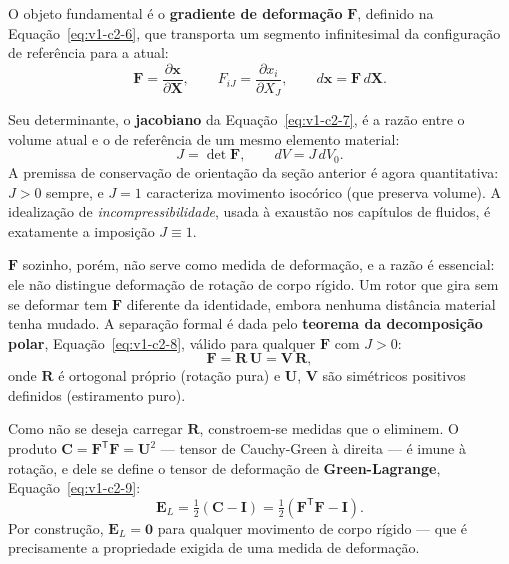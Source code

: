 \documentclass[12pt,a4paper]{article}
\numberwithin{equation}{section}
\numberwithin{table}{section}
\numberwithin{figure}{section}
\begin{document}
O objeto fundamental é o \textbf{gradiente de deformação} $\mathbf{F}$,
definido na Equação~\eqref{eq:v1-c2-6}, que transporta um segmento
infinitesimal da configuração de referência para a atual:
\begin{equation}\label{eq:v1-c2-6}
\mathbf{F} = \frac{\partial \mathbf{x}}{\partial \mathbf{X}},
\qquad F_{iJ} = \frac{\partial x_i}{\partial X_J},
\qquad d\mathbf{x} = \mathbf{F}\,d\mathbf{X}.
\end{equation}

Seu determinante, o \textbf{jacobiano} da Equação~\eqref{eq:v1-c2-7}, é a razão
entre o volume atual e o de referência de um mesmo elemento material:
\begin{equation}\label{eq:v1-c2-7}
J = \det \mathbf{F}, \qquad dV = J\,dV_0.
\end{equation}
A premissa de conservação de orientação da seção anterior é agora quantitativa:
$J>0$ sempre, e $J=1$ caracteriza movimento isocórico (que preserva volume).
A idealização de \emph{incompressibilidade}, usada à exaustão nos capítulos de
fluidos, é exatamente a imposição $J \equiv 1$.

$\mathbf{F}$ sozinho, porém, não serve como medida de deformação, e a razão é
essencial: ele não distingue deformação de rotação de corpo rígido. Um rotor
que gira sem se deformar tem $\mathbf{F}$ diferente da identidade, embora
nenhuma distância material tenha mudado. A separação formal é dada pelo
\textbf{teorema da decomposição polar}, Equação~\eqref{eq:v1-c2-8}, válido para
qualquer $\mathbf{F}$ com $J>0$:
\begin{equation}\label{eq:v1-c2-8}
\mathbf{F} = \mathbf{R}\,\mathbf{U} = \mathbf{V}\,\mathbf{R},
\end{equation}
onde $\mathbf{R}$ é ortogonal próprio (rotação pura) e $\mathbf{U}$,
$\mathbf{V}$ são simétricos positivos definidos (estiramento puro).

Como não se deseja carregar $\mathbf{R}$, constroem-se medidas que o eliminem.
O produto $\mathbf{C} = \mathbf{F}^{\mathsf{T}}\mathbf{F} = \mathbf{U}^2$
--- tensor de Cauchy-Green à direita --- é imune à rotação, e dele se define o
tensor de deformação de \textbf{Green-Lagrange}, Equação~\eqref{eq:v1-c2-9}:
\begin{equation}\label{eq:v1-c2-9}
\mathbf{E}_L = \tfrac{1}{2}\left(\mathbf{C} - \mathbf{I}\right)
= \tfrac{1}{2}\left(\mathbf{F}^{\mathsf{T}}\mathbf{F} - \mathbf{I}\right).
\end{equation}
Por construção, $\mathbf{E}_L = \mathbf{0}$ para qualquer movimento de corpo
rígido --- que é precisamente a propriedade exigida de uma medida de
deformação.
\end{document}
